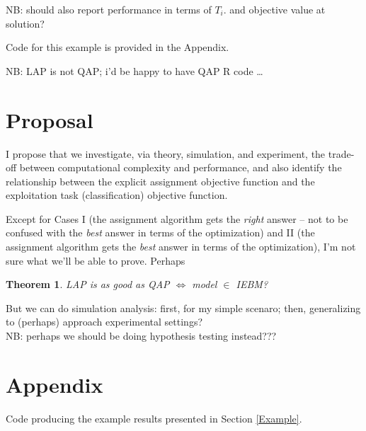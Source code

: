 \documentclass{article}
\newtheorem{thm}{Theorem}
\newcommand{\thma}{\begin{thm}}
\newcommand{\thmb}{\end{thm}}
\begin{document}
NB:
should also report performance in terms of $T_i$.
and objective value at solution?

Code for this example is provided in the Appendix.

NB: LAP is not QAP; i'd be happy to have QAP R code \dots

\section{Proposal}

I propose that we investigate,
via theory, simulation, and experiment,
the trade-off between computational complexity and performance,
and also identify the relationship between
the explicit assignment objective function
and the exploitation task (classification) objective function.

Except for Cases
I
(the assignment algorithm gets the {\em right} answer --
not to be confused with the {\em best} answer in terms of the optimization)
and
II
(the assignment algorithm gets the {\em best} answer in terms of the optimization),
I'm not sure what we'll be able to prove.
Perhaps
\thma
LAP is as good as QAP $\iff$ model $\in$ IEBM?
\thmb
But we can do simulation analysis:
first, for my simple scenaro;
then, generalizing to (perhaps) approach experimental settings?
\\

NB: perhaps we should be doing hypothesis testing instead???


\begin{comment}

Subject:   lp.assign
From:   cep@jhu.edu
Date:   Fri, June 5, 2009 1:32 pm
To:   buttrey@nps.edu
Cc:   "John Conroy" <conroyjohnm@gmail.com>

hey Sam. long time no hear.
(i'm officially (if sillily) on the rolls at nps these days!? :-)

i'm using your "lp.assign(lpSolve)" in R ...
i saw you're name, and thought to thank you.

 cran.r-project.org/web/packages/lpSolve/lpSolve.pdf

cheers,
carey
=====

\end{comment}

\section*{Appendix}

Code producing the example results presented in Section \ref{Example}.
\end{document}
